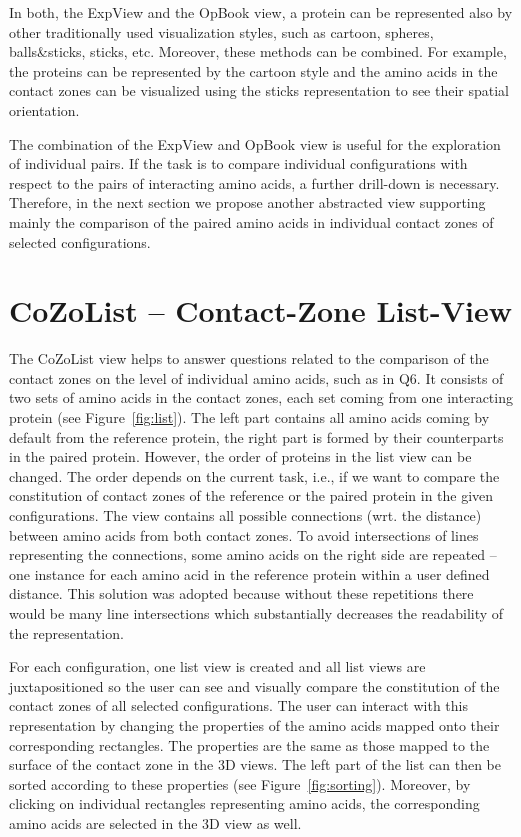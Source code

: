 \documentclass{bmcart}
\begin{document}
In both, the ExpView and the OpBook view, a protein can be represented also by other traditionally used visualization styles, such as cartoon, spheres, balls\&sticks, sticks, etc.
Moreover, these methods can be combined. 
For example, the proteins can be represented by the cartoon style and the amino acids in the contact zones can be visualized using the sticks representation to see their spatial orientation.%

The combination of the ExpView and OpBook view is useful for the exploration of individual pairs.
If the task is to compare individual configurations with respect to the pairs of interacting amino acids, a further drill-down is necessary.
Therefore, in the next section we propose another abstracted view supporting mainly the comparison of the paired amino acids in individual contact zones of selected configurations.


\section{CoZoList -- Contact-Zone List-View}
The CoZoList view helps to answer questions related to the comparison of the contact zones on the level of individual amino acids, such as in Q6.
It consists of two sets of amino acids in the contact zones, each set coming from one interacting protein (see Figure~\ref{fig:list}).
The left part contains all amino acids coming by default from the reference protein, the right part is formed by their counterparts in the paired protein.
However, the order of proteins in the list view can be changed.
The order depends on the current task, i.e., if we want to compare the constitution of contact zones of the reference or the paired protein in the given configurations.
The view contains all possible connections (wrt. the distance) between amino acids from both contact zones.
To avoid intersections of lines representing the connections, some amino acids on the right side are repeated -- one instance for each amino acid in the reference protein within a user defined distance. 
This solution was adopted because without these repetitions there would be many line intersections which substantially decreases the readability of the representation.

For each configuration, one list view is created and all list views are juxtapositioned so the user can see and visually compare the constitution of the contact zones of all selected configurations.
The user can interact with this representation by changing the properties of the amino acids mapped onto their corresponding rectangles.
The properties are the same as those mapped to the surface of the contact zone in the 3D views.
The left part of the list can then be sorted according to these properties (see Figure~\ref{fig:sorting}).
Moreover, by clicking on individual rectangles representing amino acids, the corresponding amino acids are selected in the 3D view as well.
\end{document}
